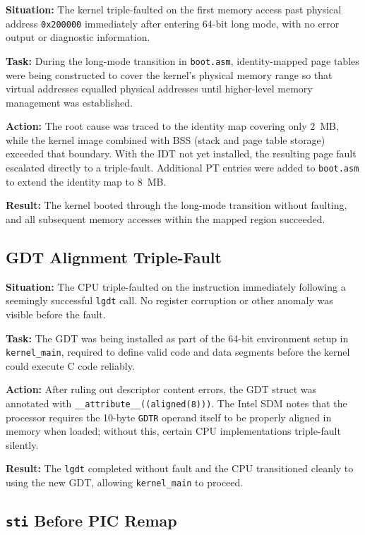 \documentclass[12pt,a4paper]{article}
\begin{document}
\textbf{Situation:} The kernel triple-faulted on the first memory access past physical address \texttt{0x200000} immediately after entering 64-bit long mode, with no error output or diagnostic information.

\textbf{Task:} During the long-mode transition in \texttt{boot.asm}, identity-mapped page tables were being constructed to cover the kernel's physical memory range so that virtual addresses equalled physical addresses until higher-level memory management was established.

\textbf{Action:} The root cause was traced to the identity map covering only 2~MB, while the kernel image combined with BSS (stack and page table storage) exceeded that boundary. With the IDT not yet installed, the resulting page fault escalated directly to a triple-fault. Additional PT entries were added to \texttt{boot.asm} to extend the identity map to 8~MB.

\textbf{Result:} The kernel booted through the long-mode transition without faulting, and all subsequent memory accesses within the mapped region succeeded.

\subsection{GDT Alignment Triple-Fault}

\textbf{Situation:} The CPU triple-faulted on the instruction immediately following a seemingly successful \texttt{lgdt} call. No register corruption or other anomaly was visible before the fault.

\textbf{Task:} The GDT was being installed as part of the 64-bit environment setup in \texttt{kernel\_main}, required to define valid code and data segments before the kernel could execute C code reliably.

\textbf{Action:} After ruling out descriptor content errors, the GDT struct was annotated with \texttt{\_\_attribute\_\_((aligned(8)))}. The Intel SDM notes that the processor requires the 10-byte \texttt{GDTR} operand itself to be properly aligned in memory when loaded; without this, certain CPU implementations triple-fault silently.

\textbf{Result:} The \texttt{lgdt} completed without fault and the CPU transitioned cleanly to using the new GDT, allowing \texttt{kernel\_main} to proceed.

\subsection{\texttt{sti} Before PIC Remap}
\end{document}

